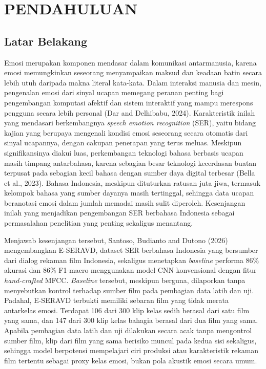 
\chapter{\MakeUppercase{Pendahuluan}}

\section{Latar Belakang}
\label{sec:1.1}

Emosi merupakan komponen mendasar dalam komunikasi antarmanusia, karena
emosi memungkinkan seseorang menyampaikan maksud dan keadaan batin
secara lebih utuh daripada makna literal kata-kata. Dalam interaksi
manusia dan mesin, pengenalan emosi dari sinyal ucapan memegang peranan
penting bagi pengembangan komputasi afektif dan sistem interaktif yang
mampu merespons pengguna secara lebih personal (Dar and Delhibabu,
2024). Karakteristik inilah yang mendasari berkembangnya \emph{speech
emotion recognition} (SER), yaitu bidang kajian yang berupaya mengenali
kondisi emosi seseorang secara otomatis dari sinyal ucapannya, dengan
cakupan penerapan yang terus meluas. Meskipun signifikansinya diakui
luas, perkembangan teknologi bahasa berbasis ucapan masih timpang
antarbahasa, karena sebagian besar teknologi kecerdasan buatan terpusat
pada sebagian kecil bahasa dengan sumber daya digital terbesar (Bella et
al., 2023). Bahasa Indonesia, meskipun dituturkan ratusan juta jiwa,
termasuk kelompok bahasa yang sumber dayanya masih tertinggal, sehingga
data ucapan beranotasi emosi dalam jumlah memadai masih sulit diperoleh.
Kesenjangan inilah yang menjadikan pengembangan SER berbahasa Indonesia
sebagai permasalahan penelitian yang penting sekaligus menantang.

Menjawab kesenjangan tersebut, Santoso, Budianto and Dutono (2026)
mengembangkan E-SERAVD, dataset SER berbahasa Indonesia yang bersumber
dari dialog rekaman film Indonesia, sekaligus menetapkan \emph{baseline}
performa 86\% akurasi dan 86\% F1-macro menggunakan model CNN
konvensional dengan fitur \emph{hand-crafted} MFCC. \emph{Baseline} tersebut,
meskipun berguna, dilaporkan tanpa menyebutkan kontrol terhadap sumber
film pada pembagian data latih dan uji. Padahal, E-SERAVD terbukti
memiliki sebaran film yang tidak merata antarkelas emosi. Terdapat 106 dari 300
klip kelas sedih berasal dari satu film yang sama, dan 147 dari 300 klip
kelas bahagia berasal dari dua film yang sama. Apabila pembagian data latih dan uji dilakukan secara
acak tanpa mengontrol sumber film, klip dari film yang sama berisiko
muncul pada kedua sisi sekaligus, sehingga model berpotensi mempelajari
ciri produksi atau karakteristik rekaman film tertentu sebagai proxy
kelas emosi, bukan pola akustik emosi secara umum. 

